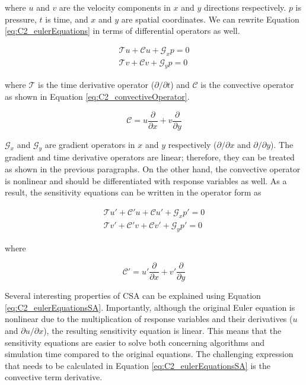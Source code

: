 where $u$ and $v$ are the velocity components in $x$ and $y$ directions respectively. $p$ is pressure, $t$ is time, and $x$ and $y$ are spatial coordinates. We can rewrite Equation \eqref{eq:C2_eulerEquations} in terms of differential operators as well.

\begin{subequations}
\begin{gather*}
    \mathcal{T} u +
    \mathcal{C} u +
    \mathcal{G}_x p = 0 
    \\
    \mathcal{T} v +
    \mathcal{C} v +
    \mathcal{G}_y p = 0 
\end{gather*}
\end{subequations}

where $\mathcal{T}$ is the time derivative operator ($\partial /\partial t$) and $\mathcal{C}$ is the convective operator as shown in Equation \eqref{eq:C2_convectiveOperator}.

\begin{equation}\label{eq:C2_convectiveOperator}
    \mathcal{C} = u \frac{\partial}{\partial x} + v \frac{\partial}{\partial y}
\end{equation}

$\mathcal{G}_x$ and $\mathcal{G}_y$ are gradient operators in $x$ and $y$ respectively ($\partial /\partial x$ and $\partial /\partial y$). The gradient and time derivative operators are linear; therefore, they can be treated as shown in the previous paragraphs. On the other hand, the convective operator is nonlinear and should be differentiated with response variables as well. As a result, the sensitivity equations can be written in the operator form as

\begin{subequations}\label{eq:C2_eulerEquationsSA}
\begin{gather}
    \mathcal{T} u' +
    \mathcal{C}' u + \mathcal{C} u' +
    \mathcal{G}_x p' = 0 
    \\
    \mathcal{T} v' +
    \mathcal{C}' v + \mathcal{C} v' +
    \mathcal{G}_y p' = 0 
\end{gather}
\end{subequations}

where

\begin{equation*}
    \mathcal{C}' = u' \frac{\partial}{\partial x} + v' \frac{\partial}{\partial y}
\end{equation*}

Several interesting properties of CSA can be explained using Equation \eqref{eq:C2_eulerEquationsSA}. Importantly, although the original Euler equation is nonlinear due to the multiplication of response variables and their derivatives ($u$ and $\partial u/\partial x$), the resulting sensitivity equation is linear. This means that the sensitivity equations are easier to solve both concerning algorithms and simulation time compared to the original equations. The challenging expression that needs to be calculated in Equation \eqref{eq:C2_eulerEquationsSA} is the convective term derivative.

